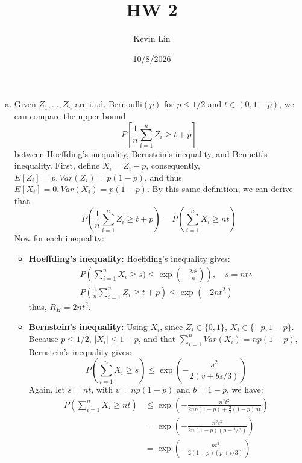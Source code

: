 \documentclass[11pt,a4paper,margin=1in]{article}
\title{HW 2}
\author{Kevin Lin}
\date{10/8/2026}
\begin{document}
\maketitle

\section{}
\begin{enumerate}[(a)]
    \item Given $Z_1, \dots, Z_n$ are i.i.d. Bernoulli$(p)$ for $p \leq 1/2$
    and $t \in (0, 1 - p)$, we can compare the upper bound
    \[
        P\left[\frac{1}{n} \sum_{i=1}^{n} Z_i \geq t + p\right]
    \]
    between Hoeffding's inequality, Bernstein's inequality, and Bennett's inequality.
    First, define $X_i = Z_i - p$, consequently, $E[Z_i] = p, Var(Z_i) = p(1 - p)$,
    and thus $E[X_i] = 0, Var(X_i) = p(1 - p)$. By this same definition, we can derive
    that 
    \[
        P\left(\frac{1}{n} \sum_{i=1}^n Z_i \geq t + p \right) = P\left(\sum_{i=1}^n X_i \geq nt\right)
    \]
    Now for each inequality:
    \begin{itemize}
        \item \textbf{Hoeffding's inequality:} Hoeffding's
        inequality gives:
        \begin{gather*}
            P\left(\sum_{i=1}^{n} X_i \geq s) \leq \exp(-\frac{2s^2}{n})\right), \quad s = nt \therefore \\
            P\left(\frac{1}{n} \sum_{i=1}^{n} Z_i \geq t + p\right) \leq \exp(-2nt^2)
        \end{gather*}
        thus, $R_H = 2nt^2$.
        \item \textbf{Bernstein's inequality:} Using $X_i$, since $Z_i \in \{0, 1\}$,
        $X_i \in \{-p, 1 - p\}$. Because $p \leq 1/2$, $|X_i| \leq 1 - p$, and 
        that $\sum_{i=1}^n Var(X_i) = np(1 - p)$, Bernstein's inequality gives:
        \[
            P\left(\sum_{i=1}^{n} X_i \geq s\right) \leq \exp\left(-\frac{s^2}{2(v + bs/3)}\right)
        \]
        Again, let $s = nt$, with $v = np(1 - p)$ and $b = 1 - p$, we have:
        \begin{align*}
            P\left(\sum_{i=1}^{n} X_i \geq nt\right) &\leq \exp\left(-\frac{n^2 t^2}{2np(1 - p) + \frac{2}{3}(1 - p)nt}\right) \\
            &= \exp\left(-\frac{n^2t^2}{2n(1 - p)(p + t/3)}\right) \\
            &= \exp\left(-\frac{nt^2}{2(1 - p)(p + t/3)}\right)
        \end{align*}

\end{itemize}
\end{enumerate}
\end{document}
